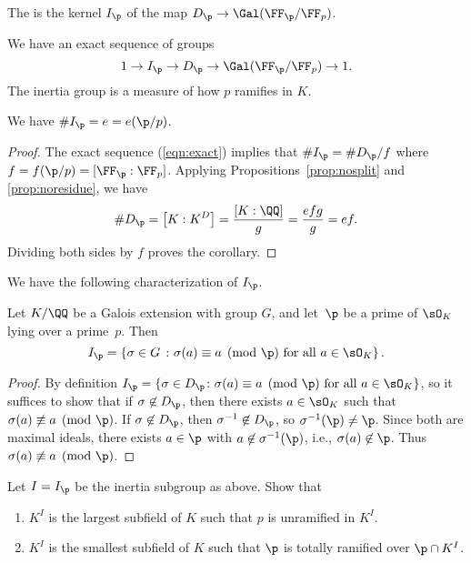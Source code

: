 \begin{definition}
  The 
  is the kernel $I_\p$ of the map $D_\p \to \Gal(\FF_{\p}/\FF_p)$.
\end{definition}
We have an exact sequence of groups
\begin{equation}\label{eqn:exact}
  1 \to I_\p \to D_\p \to \Gal(\FF_{\p}/\FF_p)\to 1.
\end{equation}
The inertia group is a measure of how $p$ ramifies in $K$.
\begin{corollary}
  We have $\# I_\p = e = e(\p/p)$.
\end{corollary}
\begin{proof}
  The exact sequence (\ref{eqn:exact}) implies that
  $\#I_\p = \#D_\p / f$ where $f = f(\p/p) = [\FF_{\p} : \FF_p]$.
  Applying Propositions~\ref{prop:nosplit} and \ref{prop:noresidue}, we have
  \[
    \#D_\p = \left[K : K^D\right] = \frac{[K:\QQ]}{g} = \frac{efg}{g} = ef.
  \]
  Dividing both sides by $f$ proves the corollary.
\end{proof}

We have the following characterization of $I_\p$.
\begin{proposition}\label{prop:charip}
  Let $K/\QQ$ be a Galois extension with group $G$,
  and let~$\p$ be a prime of $\sO_K$ lying
  over a prime~$p$.  Then
  \[
    I_\p = \left\{
    \sigma\in G \ \colon \sigma(a) \equiv a\pmod{\p}\text{ for all } a\in\sO_K
    \right\}.
  \]
\end{proposition}
\begin{proof}
  By definition $I_\p = \{\sigma\in D_\p \colon \sigma(a) \equiv
    a\pmod{\p}\text{ for all } a\in\sO_K\}$, so it suffices to show that
  if $\sigma\not\in D_\p$, then there exists $a\in\sO_K$ such that
  $\sigma(a) \not\equiv a\pmod{\p}$.  If $\sigma\not\in D_\p$, then
  $\sigma^{-1}\not\in D_\p$, so $\sigma^{-1}(\p)\neq \p$.  Since both
  are maximal ideals, there exists $a\in\p$ with
  $a\not\in\sigma^{-1}(\p)$, i.e., $\sigma(a)\not\in\p$.  Thus
  $\sigma(a) \not\equiv a\pmod{\p}$.
\end{proof}

\begin{exercise}
  Let $I = I_\p$ be the inertia subgroup as above. Show that
  \begin{enumerate}[label=(\alph*)]
    \item $K^I$ is the largest subfield of $K$ such that $p$ is unramified
          in $K^I$.
    \item $K^I$ is the smallest subfield of $K$ such that $\p$ is totally
          ramified over $\p \cap K^I$.
  \end{enumerate}
\end{exercise}

